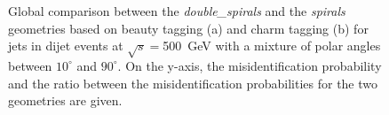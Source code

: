 \begin{figure}[H]
\begin{subfigure}[b]{0.5\textwidth}
        \caption{}
        \label{}
  \end{subfigure}
  \caption{Global comparison between the \textit{double\_spirals} and the
    \textit{spirals} geometries based on beauty tagging (a) and charm
    tagging (b) for jets in dijet events at $\sqrt{s}=$500~GeV with a mixture of polar
    angles between $10^{\circ}$ and $90^{\circ}$. On the y-axis, the misidentification probability and the ratio between the misidentification probabilities for the two geometries are given.}\label{fig:globalComparison_double_spirals_500}
\end{figure}

